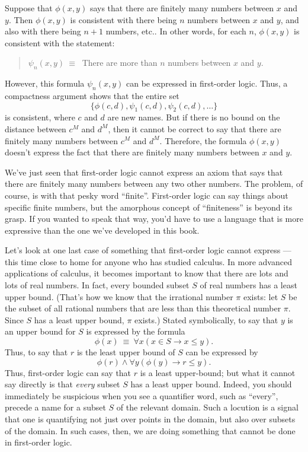 Suppose that $\phi (x,y)$ says that there are finitely many numbers
between $x$ and $y$.  Then $\phi (x,y)$ is consistent with there being
$n$ numbers between $x$ and $y$, and also with there being $n+1$
numbers, etc..  In other words, for each $n$, $\phi (x,y)$ is
consistent with the statement:
\begin{quote} $\psi _n(x,y)\:\equiv\:$ There are more than $n$ numbers
  between $x$ and $y$. \end{quote} However, this formula
$\psi _n(x,y)$ can be expressed in first-order logic.  Thus, a
compactness argument shows that the entire set
\[ \{ \phi (c,d), \psi _1(c,d),\psi _2(c,d),\dots \} \] is consistent,
where $c$ and $d$ are new names.  But if there is no bound on the
distance between $c^M$ and $d^M$, then it cannot be correct to say
that there are finitely many numbers between $c^M$ and $d^M$.
Therefore, the formula $\phi (x,y)$ doesn't express the fact that
there are finitely many numbers between $x$ and $y$.

We've just seen that first-order logic cannot express an axiom that
says that there are finitely many numbers between any two other
numbers.  The problem, of course, is with that pesky word ``finite''.
First-order logic can say things about specific finite numbers, but
the amorphous concept of ``finiteness'' is beyond its grasp.  If you
wanted to speak that way, you'd have to use a language that is more
expressive than the one we've developed in this book.

Let's look at one last case of something that first-order logic cannot
express --- this time close to home for anyone who has studied
calculus.  In more advanced applications of calculus, it becomes
important to know that there are lots and lots of real numbers.  In
fact, every bounded subset $S$ of real numbers has a least upper
bound.  (That's how we know that the irrational number $\pi$ exists:
let $S$ be the subset of all rational numbers that are less than this
theoretical number $\pi$.  Since $S$ has a least upper bound, $\pi$
exists.)  Stated symbolically, to say that $y$ is an upper bound for
$S$ is expressed by the formula
\[ \phi (x)\:\equiv \: \forall x(x\in S\to x\leq y) .\]
Thus, to say that $r$ is the least upper bound of $S$ can be expressed
by
\[ \phi (r)\wedge \forall y(\phi (y)\to r\leq y) .\] Thus, first-order
logic can say that $r$ is a least upper-bound; but what it cannot say
directly is that {\it every} subset $S$ has a least upper bound.
Indeed, you should immediately be suspicious when you see a quantifier
word, such as ``every'', precede a name for a subset $S$ of the
relevant domain.  Such a locution is a signal that one is quantifying
not just over points in the domain, but also over subsets of the
domain.  In such cases, then, we are doing something that cannot be
done in first-order logic.

